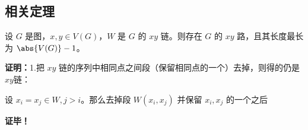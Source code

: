  
\subsection{相关定理}
\begin{theorem}{}
设 $G$ 是图，$x,y\in V(G)$，$W$ 是 $G$ 的 $xy$ 链。则存在 $G$ 的 $xy$ 路，且其长度最长为 $\abs{V(G)}-1$。
\end{theorem}

\textbf{证明：}1.把 $xy$ 链的序列中相同点之间段（保留相同点的一个）去掉，则得的仍是 $xy$链：

设 $x_i=x_j\in W,j>i$。那么去掉段 $W(x_i,x_j)$ 并保留 $x_i,x_j$ 的一个之后 



\textbf{证毕！}
















